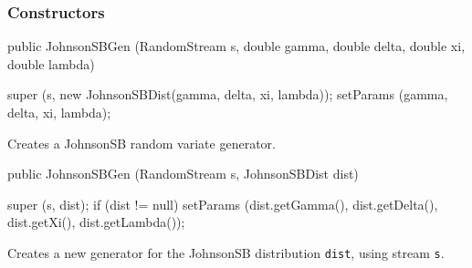 \subsubsection* {Constructors}
\begin{code}

   public JohnsonSBGen (RandomStream s, double gamma, double delta,
                        double xi, double lambda) \begin{hide} {
      super (s, new JohnsonSBDist(gamma, delta, xi, lambda));
      setParams (gamma, delta, xi, lambda);
   }\end{hide}
\end{code} 
\begin{tabb} Creates a JohnsonSB random variate generator.
\end{tabb}
\begin{code}

   public JohnsonSBGen (RandomStream s, JohnsonSBDist dist) \begin{hide} {
      super (s, dist);
      if (dist != null)
         setParams (dist.getGamma(), dist.getDelta(), dist.getXi(),
                     dist.getLambda());
   } \end{hide}
\end{code}
 \begin{tabb}  Creates a new generator for the JohnsonSB
   distribution \texttt{dist}, using stream \texttt{s}.
 \end{tabb}

